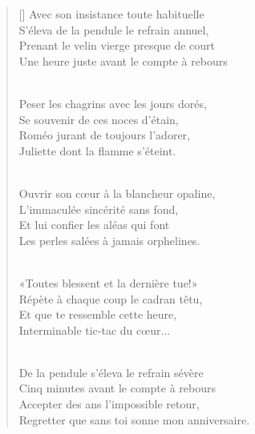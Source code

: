 \documentclass[11pt,a4paper]{article}
\begin{document}
\thispagestyle{empty}


\settowidth{\versewidth}{Regretter que sans toi sonne mon anniversaire.}

\bigskip

\begin{verse}[\versewidth]
Avec son insistance toute habituelle \\
S'éleva de la pendule le refrain annuel, \\
Prenant le velin vierge presque de court \\
Une heure juste avant le compte à rebours \\ \

Peser les chagrins avec les jours dorés, \\
Se souvenir de ces noces d'étain, \\
Roméo jurant de toujours l'adorer, \\
Juliette dont la flamme s'éteint. \\ \

Ouvrir son cœur à la blancheur opaline, \\
L'immaculée sincérité sans fond, \\
Et lui confier les aléas qui font \\
Les perles salées à jamais orphelines. \\ \

«Toutes blessent et la dernière tue!» \\
Répète à chaque coup le cadran têtu, \\
Et que te ressemble cette heure, \\
Interminable tic-tac du cœur... \\ \

De la pendule s'éleva le refrain sévère \\
Cinq minutes avant le compte à rebours \\
Accepter des ans l'impossible retour, \\
Regretter que sans toi sonne mon anniversaire.
\end{verse}
\end{document}
